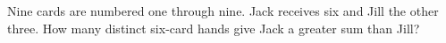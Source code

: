 Nine cards are numbered one through nine. Jack receives six and Jill the other three. How many distinct six-card hands give Jack a greater sum than Jill?
